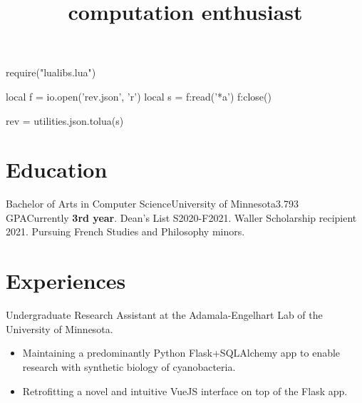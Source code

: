 \documentclass{moderncv}
\title{computation enthusiast}
\newcommand{\comment}[1]{}
\begin{document}
\begin{luacode}
require("lualibs.lua")

local f = io.open('rev.json', 'r')
local s = f:read('*a')
f:close()

rev = utilities.json.tolua(s)
\end{luacode}

\newcommand{\githash}
{
  \href{https://github.com/knownunown/website/blob/\luadirect{tex.sprint(rev)}/cv.tex}
  {\texttt{\luadirect{tex.sprint(rev)}}}
}

\makecvtitle{}
\vspace*{-5mm} %

\section{Education}
{
  Bachelor of Arts in Computer Science}{University of Minnesota}{}{3.793 GPA}{Currently \textbf{3rd year}. Dean's List S2020-F2021. Waller Scholarship recipient 2021. Pursuing French Studies and Philosophy minors.
}

\comment{
\subsection{selected CSCI coursework}
\cvlistitem{CSCI2021, Machine Architecture and Organization}
\cvlistitem{CSCI2041, Advanced Programming Principles}
\cvlistitem{CSCI2033, Elementary Computational Linear Algebra}
\cvlistitem{CSCI5551, Introduction to Intelligent Robotic Systems (in-progress)}
\cvlistitem{CSCI4611, Programming Interactive Computer Graphics and Games (in-progress)}
}

\section{Experiences}
{
  Undergraduate Research Assistant at the Adamala-Engelhart Lab of the University of Minnesota.
  \begin{itemize}[label=\textbullet,noitemsep]
  \item Maintaining a predominantly Python Flask+SQLAlchemy app to enable research with synthetic biology of cyanobacteria.
  \item Retrofitting a novel and intuitive VueJS interface on top of the Flask app.
  \end{itemize}
}
   
\end{document}
